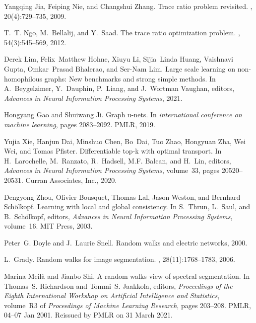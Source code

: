 \documentclass{article}
\theoremstyle{plain}
\theoremstyle{definition}
\begin{document}
{\begin{thebibliography}{10}
Yangqing Jia, Feiping Nie, and Changshui Zhang.
\newblock Trace ratio problem revisited.
, 20(4):729--735, 2009.

T.~T. Ngo, M.~Bellalij, and Y.~Saad.
\newblock The trace ratio optimization problem.
, 54(3):545--569, 2012.

Derek Lim, Felix~Matthew Hohne, Xiuyu Li, Sijia~Linda Huang, Vaishnavi Gupta,
  Omkar~Prasad Bhalerao, and Ser-Nam Lim.
\newblock Large scale learning on non-homophilous graphs: New benchmarks and
  strong simple methods.
\newblock In A.~Beygelzimer, Y.~Dauphin, P.~Liang, and J.~Wortman Vaughan,
  editors, {\em Advances in Neural Information Processing Systems}, 2021.

Hongyang Gao and Shuiwang Ji.
\newblock Graph u-nets.
\newblock In {\em international conference on machine learning}, pages
  2083--2092. PMLR, 2019.

Yujia Xie, Hanjun Dai, Minshuo Chen, Bo~Dai, Tuo Zhao, Hongyuan Zha, Wei Wei,
  and Tomas Pfister.
\newblock Differentiable top-k with optimal transport.
\newblock In H.~Larochelle, M.~Ranzato, R.~Hadsell, M.F. Balcan, and H.~Lin,
  editors, {\em Advances in Neural Information Processing Systems}, volume~33,
  pages 20520--20531. Curran Associates, Inc., 2020.

Dengyong Zhou, Olivier Bousquet, Thomas Lal, Jason Weston, and Bernhard
  Sch\"{o}lkopf.
\newblock Learning with local and global consistency.
\newblock In S.~Thrun, L.~Saul, and B.~Sch\"{o}lkopf, editors, {\em Advances in
  Neural Information Processing Systems}, volume~16. MIT Press, 2003.

Peter~G. Doyle and J.~Laurie Snell.
\newblock Random walks and electric networks, 2000.

L.~Grady.
\newblock Random walks for image segmentation.
,
  28(11):1768--1783, 2006.

Marina Meil\u{a} and Jianbo Shi.
\newblock A random walks view of spectral segmentation.
\newblock In Thomas~S. Richardson and Tommi~S. Jaakkola, editors, {\em
  Proceedings of the Eighth International Workshop on Artificial Intelligence
  and Statistics}, volume~R3 of {\em Proceedings of Machine Learning Research},
  pages 203--208. PMLR, 04--07 Jan 2001.
\newblock Reissued by PMLR on 31 March 2021.


\end{thebibliography}}
\end{document}
